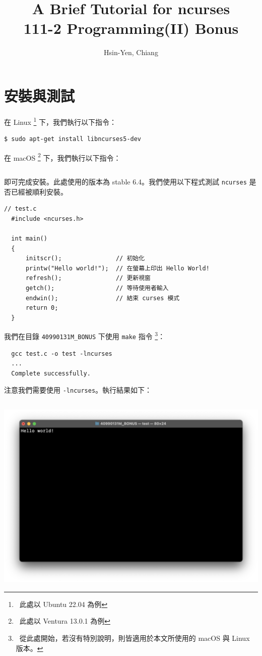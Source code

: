 \documentclass[12pt]{article}
\theoremstyle{definition}
\begin{document}
\title{A Brief Tutorial for ncurses\\
  \large 111-2 Programming(II) Bonus}
\author{Hsin-Yen, Chiang}
\maketitle
\tableofcontents
\section{安裝與測試}
\noindent
在 Linux \footnote{\ 此處以 Ubuntu 22.04 為例} 下，我們執行以下指令：
\begin{lstlisting}[style=zsh]
  $ sudo apt-get install libncurses5-dev
\end{lstlisting}
在 macOS \footnote{\ 此處以 Ventura 13.0.1 為例} 下，我們執行以下指令：
\begin{lstlisting}[style=zsh]
  % brew install ncurses
\end{lstlisting}
即可完成安裝。此處使用的版本為 stable 6.4。我們使用以下程式測試 \texttt{ncurses} 是否已經被順利安裝。
\begin{lstlisting}[style=C]
  // test.c
  #include <ncurses.h>

  int main()
  {
      initscr();               // 初始化
      printw("Hello world!");  // 在螢幕上印出 Hello World!
      refresh();               // 更新視窗
      getch();                 // 等待使用者輸入
      endwin();                // 結束 curses 模式
      return 0;
  }
\end{lstlisting}

\noindent
我們在目錄 \texttt{40990131M\_BONUS} 下使用 \texttt{make} 指令 \footnote{\ 從此處開始，若沒有特別說明，則皆適用於本文所使用的 macOS 與 Linux 版本。}：
\begin{lstlisting}[style=zsh]
  % make
  gcc test.c -o test -lncurses
  ...
  Complete successfully.
\end{lstlisting}
注意我們需要使用 \texttt{-lncurses}。執行結果如下：
\begin{lstlisting}[style=zsh]
  % ./test
\end{lstlisting}
\begin{center}
    \includegraphics[width=\textwidth]{test.png}
\end{center}
\end{document}
